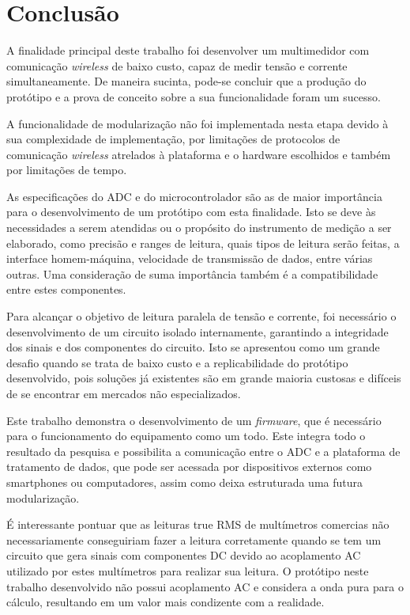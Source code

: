 \chapter{Conclusão}\label{cap:conclusoeseperspectivas}

A finalidade principal deste trabalho foi desenvolver um multimedidor com comunicação \textit{wireless} de baixo custo, capaz de medir tensão e corrente simultaneamente. De maneira sucinta, pode-se concluir que a produção do protótipo e a prova de conceito sobre a sua funcionalidade foram um sucesso.

A funcionalidade de modularização não foi implementada nesta etapa devido à sua complexidade de implementação, por limitações de protocolos de comunicação \textit{wireless} atrelados à plataforma e o hardware escolhidos e também por limitações de tempo. 

As especificações do \gls{ADC} e do microcontrolador são as de maior importância para o desenvolvimento de um protótipo com esta finalidade. Isto se deve às necessidades a serem atendidas ou o propósito do instrumento de medição a ser elaborado, como precisão e ranges de leitura, quais tipos de leitura serão feitas, a interface homem-máquina, velocidade de transmissão de dados, entre várias outras. Uma consideração de suma importância também é a compatibilidade entre estes componentes.

Para alcançar o objetivo de leitura paralela de tensão e corrente, foi necessário o desenvolvimento de um circuito isolado internamente, garantindo a integridade dos sinais e dos componentes do circuito. Isto se apresentou como um grande desafio quando se trata de baixo custo e a replicabilidade do protótipo desenvolvido, pois soluções já existentes são em grande maioria custosas e difíceis de se encontrar em mercados não especializados.

Este trabalho demonstra o desenvolvimento de um \textit{firmware}, que é necessário para o funcionamento do equipamento como um todo. Este integra todo o resultado da pesquisa e possibilita a comunicação entre o ADC e a plataforma de tratamento de dados, que pode ser acessada por dispositivos externos como smartphones ou computadores, assim como deixa estruturada uma futura modularização.

É interessante pontuar que as leituras true RMS de multímetros comercias não necessariamente conseguiriam fazer a leitura corretamente quando se tem um circuito que gera sinais com componentes DC devido ao acoplamento AC utilizado por estes multímetros para realizar sua leitura. O protótipo neste trabalho desenvolvido não possui acoplamento AC e considera a onda pura para o cálculo, resultando em um valor mais condizente com a realidade.

